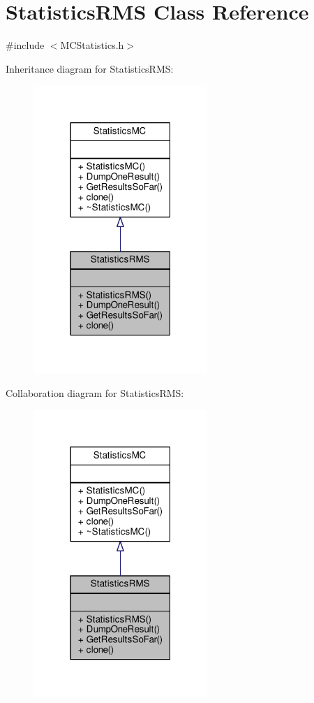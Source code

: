 \hypertarget{classStatisticsRMS}{}\section{Statistics\+R\+MS Class Reference}
\label{classStatisticsRMS}


{\ttfamily \#include $<$M\+C\+Statistics.\+h$>$}



Inheritance diagram for Statistics\+R\+MS\+:
\nopagebreak
\begin{figure}[H]
\begin{center}
\leavevmode
\includegraphics[width=187pt]{classStatisticsRMS__inherit__graph}
\end{center}
\end{figure}


Collaboration diagram for Statistics\+R\+MS\+:
\nopagebreak
\begin{figure}[H]
\begin{center}
\leavevmode
\includegraphics[width=187pt]{classStatisticsRMS__coll__graph}
\end{center}
\end{figure}
